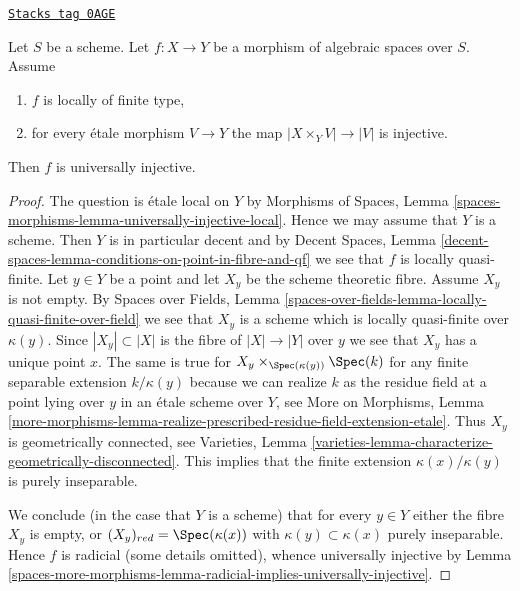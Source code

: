 \begin{lemma}
\label{spaces-more-morphisms-lemma-check-universally-injective}
\href{https://stacks.math.columbia.edu/tag/0AGE}{\texttt{Stacks tag 0AGE}}

Let $S$ be a scheme. Let $f : X \to Y$ be a morphism of algebraic
spaces over $S$. Assume
\begin{enumerate}
\item $f$ is locally of finite type,
\item for every \'etale morphism $V \to Y$ the map $|X \times_Y V| \to |V|$
is injective.
\end{enumerate}
Then $f$ is universally injective.
\end{lemma}

\begin{proof}
The question is \'etale local on $Y$ by
Morphisms of Spaces, Lemma
\ref{spaces-morphisms-lemma-universally-injective-local}.
Hence we may assume that $Y$ is a scheme.
Then $Y$ is in particular decent and by Decent Spaces, Lemma
\ref{decent-spaces-lemma-conditions-on-point-in-fibre-and-qf}
we see that $f$ is locally quasi-finite.
Let $y \in Y$ be a point and let $X_y$ be the scheme theoretic
fibre. Assume $X_y$ is not empty. By Spaces over Fields, Lemma
\ref{spaces-over-fields-lemma-locally-quasi-finite-over-field}
we see that $X_y$ is a scheme which is locally quasi-finite over
$\kappa(y)$. Since $|X_y| \subset |X|$ is the fibre of $|X| \to |Y|$
over $y$ we see that $X_y$ has a unique point $x$. The same is true
for $X_y \times_{\Spec(\kappa(y))} \Spec(k)$ for any
finite separable extension $k/\kappa(y)$
because we can realize $k$ as the residue field at a point
lying over $y$ in an \'etale scheme over $Y$,
see More on Morphisms, Lemma
\ref{more-morphisms-lemma-realize-prescribed-residue-field-extension-etale}.
Thus $X_y$ is geometrically connected, see
Varieties, Lemma \ref{varieties-lemma-characterize-geometrically-disconnected}.
This implies that the finite extension $\kappa(x)/\kappa(y)$
is purely inseparable.

\medskip\noindent
We conclude (in the case that $Y$ is a scheme)
that for every $y \in Y$ either the fibre $X_y$ is empty,
or $(X_y)_{red} = \Spec(\kappa(x))$ with
$\kappa(y) \subset \kappa(x)$ purely inseparable.
Hence $f$ is radicial (some details omitted), whence universally injective by
Lemma \ref{spaces-more-morphisms-lemma-radicial-implies-universally-injective}.
\end{proof}

